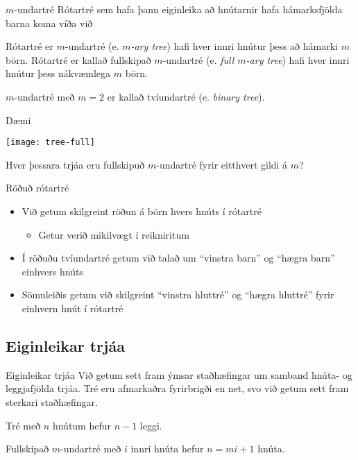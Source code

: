 \documentclass[handout]{beamer}
\begin{document}
\begin{frame}{$m$-undartré}
Rótartré sem hafa þann eiginleika að hnútarnir hafa hámarksfjölda barna koma víða við
\begin{tcolorbox}[title=$m$-undartré]
Rótartré er $m$-undartré (e. \emph{$m$-ary tree}) hafi hver innri hnútur þess að hámarki $m$ börn. Rótartré er kallað fullskipað $m$-undartré (e. \emph{full $m$-ary tree}) hafi hver innri hnútur þess nákvæmlega $m$ börn.
\end{tcolorbox}

$m$-undartré með $m = 2$ er kallað tvíundartré (e. \emph{binary tree}).
\end{frame}

\begin{frame}{Dæmi}
\begin{center}
\texttt{[image: tree-full]}
\end{center}
Hver þessara trjáa eru fullskipuð $m$-undartré fyrir eitthvert gildi á $m$?
\end{frame}

\begin{frame}{Röðuð rótartré}
\begin{itemize}
 \item Við getum skilgreint röðun á börn hvers hnúts í rótartré
 \begin{itemize}
  \item Getur verið mikilvægt í reikniritum
 \end{itemize}
 \item Í röðuðu tvíundartré getum við talað um ``vinstra barn'' og ``hægra barn'' einhvers hnúts
 \item Sömuleiðis getum við skilgreint ``vinstra hluttré'' og ``hægra hluttré'' fyrir einhvern hnút í rótartré
\end{itemize}
\end{frame}

\subsection{Eiginleikar trjáa}

\begin{frame}{Eiginleikar trjáa}
Við getum sett fram ýmsar staðhæfingar um samband hnúta- og leggjafjölda trjáa. Tré eru afmarkaðra fyrirbrigði en net, svo við getum sett fram sterkari staðhæfingar.

\begin{tcolorbox}
Tré með $n$ hnútum hefur $n-1$ leggi.
\end{tcolorbox}

\begin{tcolorbox}
Fullskipað $m$-undartré með $i$ innri hnúta hefur $n = mi +1$ hnúta.
\end{tcolorbox}
\end{frame}
\end{document}
